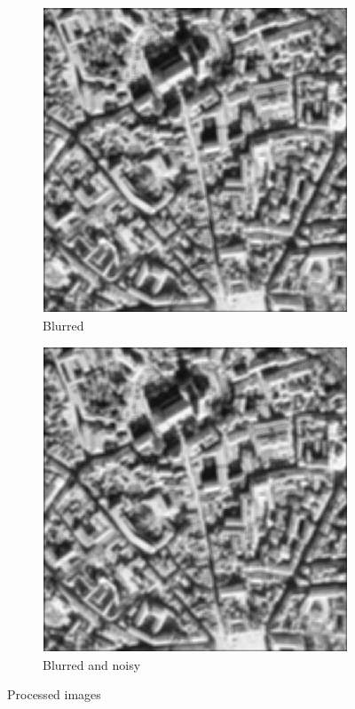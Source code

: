 \begin{figure}[!ht]
\begin{subfigure}{0.32\textwidth}
        \includegraphics[width=\textwidth]{Doc/Graphics/Part1/Q17_Blurred.png}
        \caption{Blurred}
    \end{subfigure}
    \hfill
    \begin{subfigure}{0.32\textwidth}
        \centering
        \includegraphics[width=\textwidth]{Doc/Graphics/Part1/Q17_Noisy.png}
        \caption{Blurred and noisy}
    \end{subfigure}
    \caption{Processed images}
    \label{fig:resultQ16}
\end{figure}

